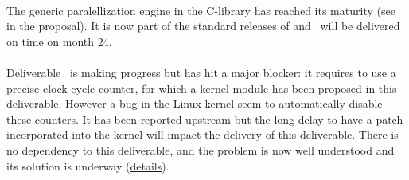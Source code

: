 \documentclass{deliverablereport}
\begin{document}
\paragraph{}
The generic paralellization engine in the \Pari C-library
  has reached its maturity (see~ in the proposal).
  It is now part of the standard releases of \Pari and~
  will be delivered on time on month 24.

\paragraph{}

\paragraph{}


  \paragraph{}


  \paragraph{}
  Deliverable~ is making progress but has hit a
  major blocker: it requires to use a precise clock cycle counter, for which a kernel
  module has been proposed in this deliverable. However a bug in the Linux kernel seem to
  automatically disable these counters. It has been reported upstream but the long delay
  to have a patch incorporated into the kernel will impact the delivery of this
  deliverable. There is no dependency to this deliverable, and the problem is now well
  understood and its solution is underway
  (\href{https://github.com/OpenDreamKit/OpenDreamKit/issues/118}{details}).

  \paragraph{}

  \paragraph{}
\end{document}

